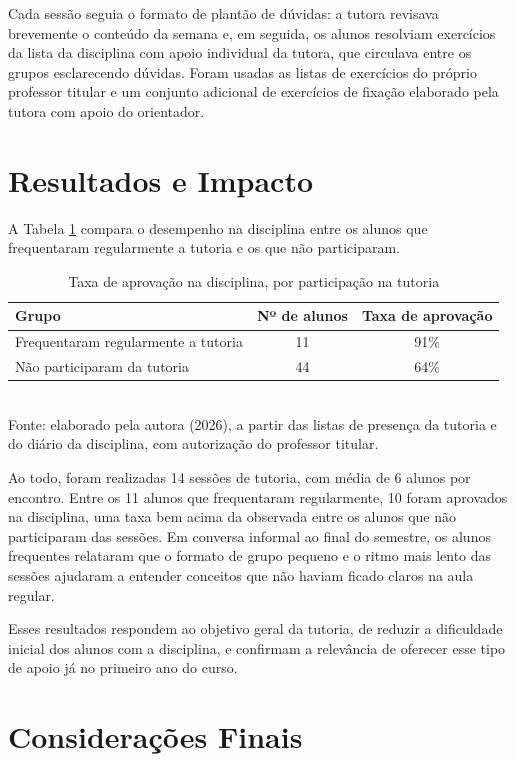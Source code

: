 \documentclass[article,12pt,a4paper]{abntex2}
\begin{document}
Cada sessão seguia o formato de plantão de dúvidas: a tutora revisava
brevemente o conteúdo da semana e, em seguida, os alunos resolviam
exercícios da lista da disciplina com apoio individual da tutora, que
circulava entre os grupos esclarecendo dúvidas. Foram usadas as listas de
exercícios do próprio professor titular e um conjunto adicional de
exercícios de fixação elaborado pela tutora com apoio do orientador.

\section{Resultados e Impacto}

A Tabela \ref{tab:resultados-tal} compara o desempenho na disciplina entre
os alunos que frequentaram regularmente a tutoria e os que não
participaram.

\begin{table}[!ht]
  \centering
  \caption{Taxa de aprovação na disciplina, por participação na tutoria}
  \label{tab:resultados-tal}
  \begin{tabular}{lcc}
    \hline
    Grupo & Nº de alunos & Taxa de aprovação \\
    \hline
    Frequentaram regularmente a tutoria & 11 & 91\% \\
    Não participaram da tutoria         & 44 & 64\% \\
    \hline
  \end{tabular}
  \\[0.3em]
  {\footnotesize Fonte: elaborado pela autora (2026), a partir das listas de presença da tutoria e do diário da disciplina, com autorização do professor titular.}
\end{table}

Ao todo, foram realizadas 14 sessões de tutoria, com média de 6 alunos por
encontro. Entre os 11 alunos que frequentaram regularmente, 10 foram
aprovados na disciplina, uma taxa bem acima da observada entre os alunos
que não participaram das sessões. Em conversa informal ao final do
semestre, os alunos frequentes relataram que o formato de grupo pequeno e
o ritmo mais lento das sessões ajudaram a entender conceitos que não
haviam ficado claros na aula regular.

Esses resultados respondem ao objetivo geral da tutoria, de reduzir a
dificuldade inicial dos alunos com a disciplina, e confirmam a relevância
de oferecer esse tipo de apoio já no primeiro ano do curso.

\section{Considerações Finais}
\end{document}

